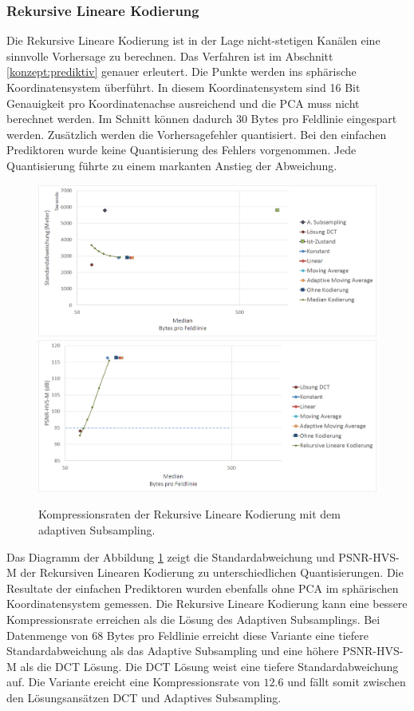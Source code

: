 \subsubsection{Rekursive Lineare Kodierung}
Die Rekursive Lineare Kodierung ist in der Lage nicht-stetigen Kanälen eine sinnvolle Vorhersage zu berechnen. Das Verfahren ist im Abschnitt \ref{konzept:prediktiv} genauer erleutert. Die Punkte werden ins sphärische Koordinatensystem überführt. In diesem Koordinatensystem sind 16 Bit Genauigkeit pro Koordinatenachse ausreichend und die PCA muss nicht berechnet werden. Im Schnitt können dadurch $30$ Bytes pro Feldlinie eingespart werden. 
Zusätzlich werden die Vorhersagefehler quantisiert. Bei den einfachen Prediktoren wurde keine Quantisierung des Fehlers vorgenommen. Jede Quantisierung führte zu einem markanten Anstieg der Abweichung.\\
\begin{figure}[!htbp]
	\center
	\includegraphics[width=1\textwidth,keepaspectratio]{./pictures/resultate/loesung2/variante2/resultate.png}
	\includegraphics[width=1\textwidth,keepaspectratio]{./pictures/resultate/loesung2/variante2/resultate_psnr.png}
	\caption{Kompressionsraten der Rekursive Lineare Kodierung mit dem adaptiven Subsampling.}
	\label{resultate:loesung2:adaptive:median}
\end{figure}
Das Diagramm der Abbildung \ref{resultate:loesung2:adaptive:median} zeigt die Standardabweichung und PSNR-HVS-M der Rekursiven Linearen Kodierung zu unterschiedlichen Quantisierungen. Die Resultate der einfachen Prediktoren wurden ebenfalls ohne PCA im sphärischen Koordinatensystem gemessen. Die Rekursive Lineare Kodierung kann eine bessere Kompressionsrate erreichen als die Lösung des Adaptiven Subsamplings. Bei Datenmenge von $68$ Bytes pro Feldlinie erreicht diese Variante eine tiefere Standardabweichung als das Adaptive Subsampling und eine höhere PSNR-HVS-M als die DCT Lösung. Die DCT Lösung weist eine tiefere Standardabweichung auf. Die Variante ereicht eine Kompressionsrate von $12.6$ und fällt somit zwischen den Lösungsansätzen DCT und Adaptives Subsampling.

